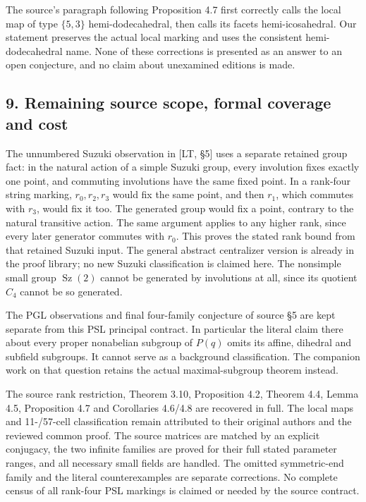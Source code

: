 \documentclass[
  11pt,
]{article}
\begin{document}
The source's paragraph following Proposition 4.7 first correctly calls
the local map of type \(\{5,3\}\) hemi-dodecahedral, then calls its
facets hemi-icosahedral. Our statement preserves the actual local
marking and uses the consistent hemi-dodecahedral name. None of these
corrections is presented as an answer to an open conjecture, and no
claim about unexamined editions is made.

\subsection{9. Remaining source scope, formal coverage and
cost}\label{remaining-source-scope-formal-coverage-and-cost}

The unnumbered Suzuki observation in {[}LT, §5{]} uses a separate
retained group fact: in the natural action of a simple Suzuki group,
every involution fixes exactly one point, and commuting involutions have
the same fixed point. In a rank-four string marking, \(r_0,r_2,r_3\)
would fix the same point, and then \(r_1\), which commutes with \(r_3\),
would fix it too. The generated group would fix a point, contrary to the
natural transitive action. The same argument applies to any higher rank,
since every later generator commutes with \(r_0\). This proves the
stated rank bound from that retained Suzuki input. The general abstract
centralizer version is already in the proof library; no new Suzuki
classification is claimed here. The nonsimple small group
\(\operatorname{Sz}(2)\) cannot be generated by involutions at all,
since its quotient \(C_4\) cannot be so generated.

The PGL observations and final four-family conjecture of source §5 are
kept separate from this PSL principal contract. In particular the
literal claim there about every proper nonabelian subgroup of \(P(q)\)
omits its affine, dihedral and subfield subgroups. It cannot serve as a
background classification. The companion work on that question retains
the actual maximal-subgroup theorem instead.

The source rank restriction, Theorem 3.10, Proposition 4.2, Theorem 4.4,
Lemma 4.5, Proposition 4.7 and Corollaries 4.6/4.8 are recovered in
full. The local maps and 11-/57-cell classification remain attributed to
their original authors and the reviewed common proof. The source
matrices are matched by an explicit conjugacy, the two infinite families
are proved for their full stated parameter ranges, and all necessary
small fields are handled. The omitted symmetric-end family and the
literal counterexamples are separate corrections. No complete census of
all rank-four PSL markings is claimed or needed by the source contract.
\end{document}
